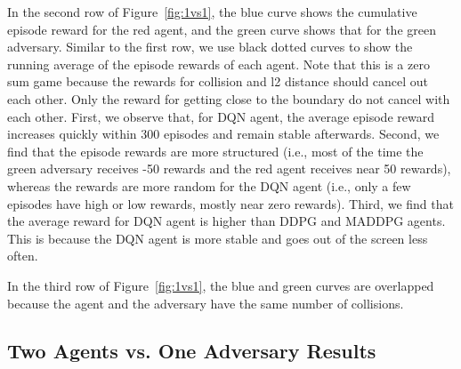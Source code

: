 In the second row of Figure~\ref{fig:1vs1}, the blue curve shows the cumulative
episode reward for the red agent, and the green curve shows that for the green
adversary. Similar to the first row, we use black dotted curves to show the
running average of the episode rewards of each agent. Note that this is a zero
sum game because the rewards for collision and l2 distance should cancel out
each other. Only the reward for getting close to the boundary do not cancel
with each other. First, we observe that,
for DQN agent, the average episode reward increases quickly within 300
episodes and remain stable afterwards. Second, we find that the episode rewards
are more structured (i.e., most of the time the green adversary receives -50
rewards and the red agent receives near 50 rewards), whereas the rewards are
more random for the DQN agent (i.e., only a few episodes have high or low
rewards, mostly near zero rewards). Third, we find that the average reward for
DQN agent is higher than DDPG and MADDPG agents. This is because the DQN agent
is more stable and goes out of the screen less often.

In the third row of Figure~\ref{fig:1vs1}, the blue and green curves are
overlapped because the agent and the adversary have the same number of
collisions.



\subsection{Two Agents vs. One Adversary Results}
\label{sec:experiment:1vs2}


